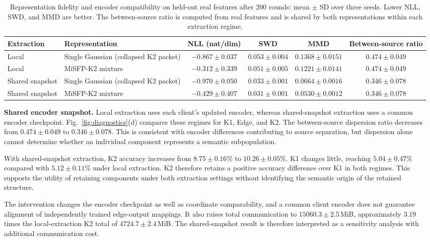 \begin{table}[t]
\caption{Representation fidelity and encoder compatibility on held-out real features after 200 rounds: mean $\pm$ SD over three seeds. Lower NLL, SWD, and MMD are better. The between-source ratio is computed from real features and is shared by both representations within each extraction regime.}
\label{tab:fidelity}
\centering
\footnotesize
\setlength{\tabcolsep}{4pt}
\begin{tabular*}{\textwidth}{@{\extracolsep{\fill}}llcccc@{}}
\toprule
Extraction & Representation & NLL (nat/dim) & SWD & MMD & Between-source ratio\\
\midrule
Local & Single Gaussian (collapsed K2 packet) & $-0.867\pm0.037$ & $0.053\pm0.004$ & $0.1368\pm0.0151$ & $0.474\pm0.049$\\
Local & MiSFP-K2 mixture & $-0.312\pm0.339$ & $0.051\pm0.005$ & $0.1221\pm0.0141$ & $0.474\pm0.049$\\
Shared snapshot & Single Gaussian (collapsed K2 packet) & $-0.970\pm0.050$ & $0.033\pm0.001$ & $0.0664\pm0.0016$ & $0.346\pm0.078$\\
Shared snapshot & MiSFP-K2 mixture & $-0.429\pm0.407$ & $0.031\pm0.001$ & $0.0530\pm0.0012$ & $0.346\pm0.078$\\
\bottomrule
\end{tabular*}
\end{table}

\noindent\textbf{Shared encoder snapshot.} Local extraction uses each client's updated encoder, whereas shared-snapshot extraction uses a common encoder checkpoint. Fig.~\ref{fig:diagnostics}(d) compares these regimes for K1, Edge, and K2. The between-source dispersion ratio decreases from $0.474\pm0.049$ to $0.346\pm0.078$. This is consistent with encoder differences contributing to source separation, but dispersion alone cannot determine whether an individual component represents a semantic subpopulation.

With shared-snapshot extraction, K2 accuracy increases from $8.75\pm0.16\%$ to $10.26\pm0.05\%$. K1 changes little, reaching $5.04\pm0.47\%$ compared with $5.12\pm0.11\%$ under local extraction. K2 therefore retains a positive accuracy difference over K1 in both regimes. This supports the utility of retaining components under both extraction settings without identifying the semantic origin of the retained structure.

The intervention changes the encoder checkpoint as well as coordinate comparability, and a common client encoder does not guarantee alignment of independently trained edge-output mappings. It also raises total communication to $15060.3\pm2.5$\,MiB, approximately $3.19$ times the local-extraction K2 total of $4724.7\pm2.4$\,MiB. The shared-snapshot result is therefore interpreted as a sensitivity analysis with additional communication cost.